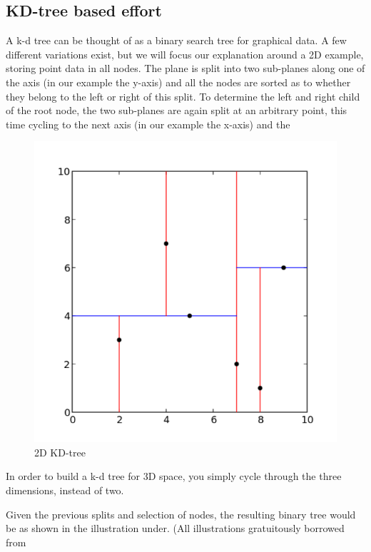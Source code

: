 \subsection{KD-tree based effort} %
\label{sub:kd_tree_based_effort}

A k-d tree can be thought of as a binary search tree for graphical data. A few different variations exist, but we will focus our explanation around a 2D example, storing point data in all nodes. The plane is split into two sub-planes along one of the axis (in our example the y-axis) and all the nodes are sorted as to whether they belong to the left or right of this split. To determine the left and right child of the root node, the two sub-planes are again split at an arbitrary point, this time cycling to the next axis (in our example the x-axis) and the

\begin{figure}[ht!]
\centering
\includegraphics[width=120mm]{../gfx/Kdtree_2d.png}

\caption{2D KD-tree}
\label{fig:kdtree_2d}
\end{figure}

In order to build a k-d tree for 3D space, you simply cycle through the three dimensions, instead of two.

Given the previous splits and selection of nodes, the resulting binary tree would be as shown in the illustration under. (All illustrations gratuitously borrowed from

